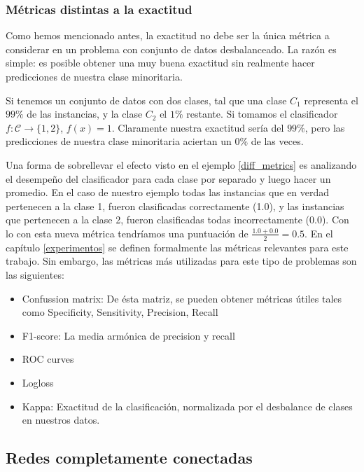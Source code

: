     \subsubsection{Métricas distintas a la exactitud}
    Como hemos mencionado antes, la exactitud no debe ser la única métrica a considerar en un problema con conjunto de datos desbalanceado. La razón es simple: es posible obtener una muy buena exactitud sin realmente hacer predicciones de nuestra clase minoritaria.
    \begin{example}
        \label{diff_metrics}
        Si tenemos un conjunto de datos con dos clases, tal que una clase $C_1$ representa el $99\%$ de las instancias, y la clase $C_2$ el $1\%$ restante. Si tomamos el clasificador $f: \mathcal C \to \{1,2\}$, $f(x) = 1$. Claramente nuestra exactitud sería del $99\%$, pero las predicciones de nuestra clase minoritaria aciertan un $0\%$ de las veces.
    \end{example}{}
    Una forma de sobrellevar el efecto visto en el ejemplo \ref{diff_metrics} es analizando el desempeño del clasificador para cada clase por separado y luego hacer un promedio. En el caso de nuestro ejemplo todas las instancias que en verdad pertenecen a la clase 1, fueron clasificadas correctamente (1.0), y las instancias que pertenecen a la clase 2, fueron clasificadas todas incorrectamente (0.0). Con lo con esta nueva métrica tendríamos una puntuación de $\frac{1.0 + 0.0}{2} = 0.5$. En el capítulo \ref{experimentos} se definen formalmente las métricas relevantes para este trabajo. Sin embargo, las métricas más utilizadas para este tipo de problemas son las siguientes:
    \begin{itemize}
        \item Confussion matrix: De ésta matriz, se pueden obtener métricas útiles tales como Specificity, Sensitivity, Precision, Recall
        \item F1-score: La media armónica de precision y recall
        \item ROC curves
        \item Logloss
        \item Kappa: Exactitud de la clasificación, normalizada por el desbalance de clases en nuestros datos.
    \end{itemize}

    \subsection{Redes completamente conectadas}

